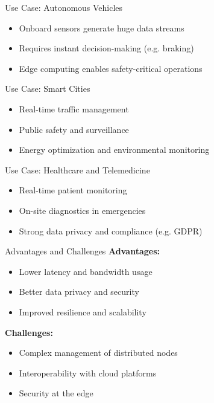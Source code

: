\documentclass{beamer}
\begin{document}
\begin{frame}{Use Case: Autonomous Vehicles}
  \begin{itemize}
    \item Onboard sensors generate huge data streams
    \item Requires instant decision-making (e.g. braking)
    \item Edge computing enables safety-critical operations
  \end{itemize}
\end{frame}

\begin{frame}{Use Case: Smart Cities}
  \begin{itemize}
    \item Real-time traffic management
    \item Public safety and surveillance
    \item Energy optimization and environmental monitoring
  \end{itemize}
\end{frame}

\begin{frame}{Use Case: Healthcare and Telemedicine}
  \begin{itemize}
    \item Real-time patient monitoring
    \item On-site diagnostics in emergencies
    \item Strong data privacy and compliance (e.g. GDPR)
  \end{itemize}
\end{frame}

\begin{frame}{Advantages and Challenges}
  \textbf{Advantages:}
  \begin{itemize}
    \item Lower latency and bandwidth usage
    \item Better data privacy and security
    \item Improved resilience and scalability
  \end{itemize}
  \vspace{0.3cm}
  \textbf{Challenges:}
  \begin{itemize}
    \item Complex management of distributed nodes
    \item Interoperability with cloud platforms
    \item Security at the edge
  \end{itemize}
\end{frame}
\end{document}
